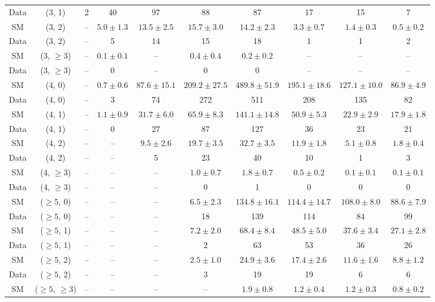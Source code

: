 \begin{table}[h!]
{\begin{tabular}{cccccccccc}
	Data & (3, 1) & 2 & 40 & 97 & 88 & 87 & 17 & 15 & 7 \\[0.5ex] 
	SM & (3, 2) & -- & $5.0\pm 1.3$ & $13.5\pm 2.5$ & $15.7\pm 3.0$ & $14.2\pm 2.3$ & $3.3\pm 0.7$ & $1.4\pm 0.3$ & $0.5\pm 0.2$ \\[0.5ex] 
	Data & (3, 2) & -- & 5 & 14 & 15 & 18 & 1 & 1 & 2 \\[0.5ex] 
	SM & (3, $\ge3$) & -- & $0.1\pm 0.1$ & -- & $0.4\pm 0.4$ & $0.2\pm 0.2$ & -- & -- & -- \\[0.5ex] 
	Data & (3, $\ge3$) & -- & 0 & -- & 0 & 0 & -- & -- & -- \\[0.5ex] 
	SM & (4, 0) & -- & $0.7\pm 0.6$ & $87.6\pm 15.1$ & $209.2\pm 27.5$ & $489.8\pm 51.9$ & $195.1\pm 18.6$ & $127.1\pm 10.0$ & $86.9\pm 4.9$ \\[0.5ex] 
	Data & (4, 0) & -- & 3 & 74 & 272 & 511 & 208 & 135 & 82 \\[0.5ex] 
	SM & (4, 1) & -- & $1.1\pm 0.9$ & $31.7\pm 6.0$ & $65.9\pm 8.3$ & $141.1\pm 14.8$ & $50.9\pm 5.3$ & $22.9\pm 2.9$ & $17.9\pm 1.8$ \\[0.5ex] 
	Data & (4, 1) & -- & 0 & 27 & 87 & 127 & 36 & 23 & 21 \\[0.5ex] 
	SM & (4, 2) & -- & -- & $9.5\pm 2.6$ & $19.7\pm 3.5$ & $32.7\pm 3.5$ & $11.9\pm 1.8$ & $5.1\pm 0.8$ & $1.8\pm 0.4$ \\[0.5ex] 
	Data & (4, 2) & -- & -- & 5 & 23 & 40 & 10 & 1 & 3 \\[0.5ex] 
	SM & (4, $\ge3$) & -- & -- & -- & $1.0\pm 0.7$ & $1.8\pm 0.7$ & $0.5\pm 0.2$ & $0.1\pm 0.1$ & $0.1\pm 0.1$ \\[0.5ex] 
	Data & (4, $\ge3$) & -- & -- & -- & 0 & 1 & 0 & 0 & 0 \\[0.5ex] 
	SM & ($\ge5$, 0) & -- & -- & -- & $6.5\pm 2.3$ & $134.8\pm 16.1$ & $114.4\pm 14.7$ & $108.0\pm 8.0$ & $88.6\pm 7.9$ \\[0.5ex] 
	Data & ($\ge5$, 0) & -- & -- & -- & 18 & 139 & 114 & 84 & 99 \\[0.5ex] 
	SM & ($\ge5$, 1) & -- & -- & -- & $7.2\pm 2.0$ & $68.4\pm 8.4$ & $48.5\pm 5.0$ & $37.6\pm 3.4$ & $27.1\pm 2.8$ \\[0.5ex] 
	Data & ($\ge5$, 1) & -- & -- & -- & 2 & 63 & 53 & 36 & 26 \\[0.5ex] 
	SM & ($\ge5$, 2) & -- & -- & -- & $2.5\pm 1.0$ & $24.9\pm 3.6$ & $17.4\pm 2.6$ & $11.6\pm 1.6$ & $8.8\pm 1.2$ \\[0.5ex] 
	Data & ($\ge5$, 2) & -- & -- & -- & 3 & 19 & 19 & 6 & 6 \\[0.5ex] 
	SM & ($\ge5$, $\ge3$) & -- & -- & -- & -- & $1.9\pm 0.8$ & $1.2\pm 0.4$ & $1.2\pm 0.3$ & $0.8\pm 0.2$ \\[0.5ex] 

\end{tabular}}
\end{table}
